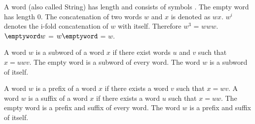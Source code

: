     A word \word (also called String) has length \length and consists of symbols \symbol \elem \sigmaS.\newline
    The empty word \emptyword has length 0.\newline
    The concatenation of two words $w$ and $x$ is denoted as $wx$.\newline
    $w^i$ denotes the i-fold concatenation of $w$ with itself. Therefore $w^3$ = $www$.\newline
    $\emptyword w$ = $w \emptyword$ = $w$.\newline

    A word $w$ is a subword of a word $x$ if there exist words $u$ and $v$ such that $x = uwv$.\newline
    The empty word is a subword of every word.\newline
    The word $w$ is a subword of itself.\newline

    A word $w$ is a prefix of a word $x$ if there exists a word $v$ such that $x = wv$.\newline
    A word $w$ is a suffix of a word $x$ if there exists a word $u$ such that $x = uw$.\newline
    The empty word is a prefix and suffix of every word.\newline
    The word $w$ is a prefix and suffix of itself.\newline
{}
